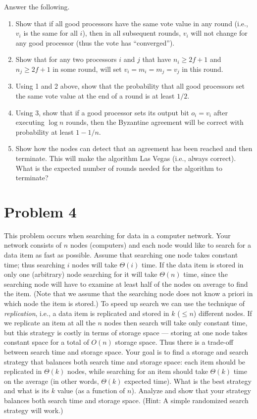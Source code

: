 \documentclass[11pt]{article}
\begin{document}
Answer the following.

\begin{enumerate}
    \item Show that if all good processors have the same vote value in any round (i.e., $v_i $ is the same for all $i$), then in all subsequent rounds, $v_i$ will not change for any good processor (thus the vote has ``converged'').
    \item Show that for any two processors $i$ and $j$ that have $n_i \geq 2f+1$ and $n_j \geq 2f+1$ in some round, will
    set $v_i=m_i = m_j = v_j$ in this round. 
    \item Using 1 and 2 above, show that the probability that all good processors set the same vote value at the end of a round is at least $1/2$.
\item Using 3, show that if a good processor sets its output bit $o_i = v_i$ after executing $\log n$ rounds, then the Byzantine agreement will be correct with probability at least $1-1/n$.
\item Show how the nodes can detect that an agreement has been reached and then terminate. This will make the algorithm Las Vegas (i.e., always correct). What is the expected number of rounds needed for the algorithm to terminate?
    
\end{enumerate}




\section*{Problem 4}

This problem occurs  when searching
for data in a computer network. Your  network consists of $n$
nodes (computers) and each node would like to search for a data
item as fast as possible. Assume that searching one node takes
constant time; thus searching $i$ nodes will take $\Theta(i)$
time. If the data item is stored in only one (arbitrary) node
searching for it will take $\Theta(n)$
 time, since the searching node will have to examine at
least half of the nodes on average to find the item. (Note that we
assume that the searching node does not know a priori  in which
node the item is stored.) To speed up search we can use the
technique of {\em replication}, i.e., a data item is replicated
and stored in $k$ ($\leq n$) different nodes. If we replicate an
item at all the $n$ nodes then search will take only constant
time, but this strategy is costly in terms of storage space ---
storing at one node takes constant space for a total of  $O(n)$
storage space. Thus there is a trade-off between search time and
storage space. Your goal is to find a storage and search strategy
that balances both search time and storage space: each item should
be replicated in $\Theta(k)$ nodes, while searching for an item
should take $\Theta(k)$ time on the average (in other words,
$\Theta(k)$ expected time). What is the best strategy and what is
its   $k$ value (as a function of $n$). Analyze and show that your
strategy balances both search time and storage space.  (Hint: A
simple randomized search strategy will work.)
\end{document}
